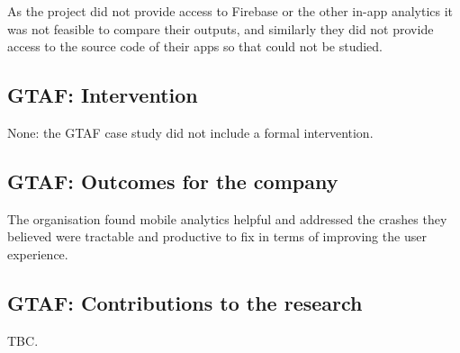 As the project did not provide access to Firebase or the other in-app analytics it was not feasible to compare their outputs, and similarly they did not provide access to the source code of their apps so that could not be studied.

\subsection{GTAF: Intervention}
None: the GTAF case study did not include a formal intervention.

\subsection{GTAF: Outcomes for the company}
The organisation found mobile analytics helpful and addressed the crashes they believed were tractable and productive to fix in terms of improving the user experience.


\subsection{GTAF: Contributions to the research}
TBC.


